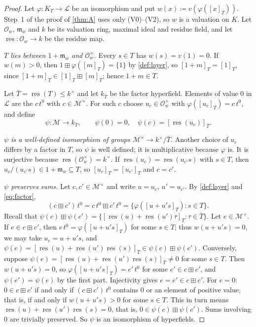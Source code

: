 \documentclass[11pt]{amsart}
\numberwithin{equation}{section}
\newcommand{\hplus}{\boxplus}
\newcommand{\m}{\mathfrak m}
\newcommand{\Mas}{\mathcal M}
\newcommand{\Lay}{\mathcal L}
\newcommand{\res}{\operatorname{res}}
\newcommand{\cls}[1]{[#1]}
\newcommand{\lt}[2]{#1\,t^{#2}}
\begin{document}
\begin{proof}
Let $\varphi\colon K_T\to\Lay$ be an isomorphism and put $w(x)\coloneqq v(\varphi(\cls x_T))$. Step~1 of the proof of \cref{thm:A} uses only (V0)--(V2), so $w$ is a valuation on $K$. Let $\mathcal O_w$, $\m_w$ and $k$ be its valuation ring, maximal ideal and residue field, and let $\res\colon\mathcal O_w\to k$ be the residue map.

\emph{$T$ lies between $1+\m_w$ and $\mathcal O_w^\times$.} Every $s\in T$ has $w(s)=v(1)=0$. If $w(m)>0$, then $1\hplus\varphi(\cls m_T)=\{1\}$ by \cref{def:layer}, so $\cls{1+m}_T=\cls1_T$, since $\cls{1+m}_T\in\cls1_T\hplus\cls m_T$; hence $1+m\in T$.

Let $\bar T=\res(T)\le k^\times$ and let $k_{\bar T}$ be the factor hyperfield. Elements of value $0$ in $\Lay$ are the $c\,t^0$ with $c\in\Mas^\times$. For such $c$ choose $u_c\in\mathcal O_w^\times$ with $\varphi(\cls{u_c}_T)=c\,t^0$, and define
\[
  \psi\colon\Mas\to k_{\bar T},\qquad \psi(0)=0,\quad \psi(c)=\cls{\res(u_c)}_{\bar T}.
\]

\emph{$\psi$ is a well-defined isomorphism of groups $\Mas^\times\to k^\times/\bar T$.} Another choice of $u_c$ differs by a factor in $T$, so $\psi$ is well defined; it is multiplicative because $\varphi$ is. It is surjective because $\res(\mathcal O_w^\times)=k^\times$. If $\res(u_c)=\res(u_{c'}s)$ with $s\in T$, then $u_c/(u_{c'}s)\in1+\m_w\subseteq T$, so $\cls{u_c}_T=\cls{u_{c'}}_T$ and $c=c'$.

\emph{$\psi$ preserves sums.} Let $c,c'\in\Mas^\times$ and write $u=u_c$, $u'=u_{c'}$. By \cref{def:layer} and \eqref{eq:factor},
\[
  \lt{(c\hplus c')}{0}=c\,t^0\hplus c'\,t^0=\{\varphi(\cls{u+u's}_T):s\in T\}.
\]
Recall that $\psi(c)\hplus\psi(c')=\{\cls{\res(u)+\res(u')\tau}_{\bar T}:\tau\in\bar T\}$. Let $e\in\Mas^\times$. If $e\in c\hplus c'$, then $e\,t^0=\varphi(\cls{u+u's}_T)$ for some $s\in T$; thus $w(u+u's)=0$, we may take $u_e=u+u's$, and $\psi(e)=\cls{\res(u)+\res(u')\res(s)}_{\bar T}\in\psi(c)\hplus\psi(c')$. Conversely, suppose $\psi(e)=\cls{\res(u)+\res(u')\res(s)}_{\bar T}\ne0$ for some $s\in T$. Then $w(u+u's)=0$, so $\varphi(\cls{u+u's}_T)=e'\,t^0$ for some $e'\in c\hplus c'$, and $\psi(e')=\psi(e)$ by the first part. Injectivity gives $e=e'\in c\hplus c'$. For $e=0$: $0\in c\hplus c'$ if and only if $\lt{(c\hplus c')}{0}$ contains $0$ or an element of positive value, that is, if and only if $w(u+u's)>0$ for some $s\in T$. This in turn means $\res(u)+\res(u')\res(s)=0$, that is, $0\in\psi(c)\hplus\psi(c')$. Sums involving $0$ are trivially preserved. So $\psi$ is an isomorphism of hyperfields.
\end{proof}
\end{document}
